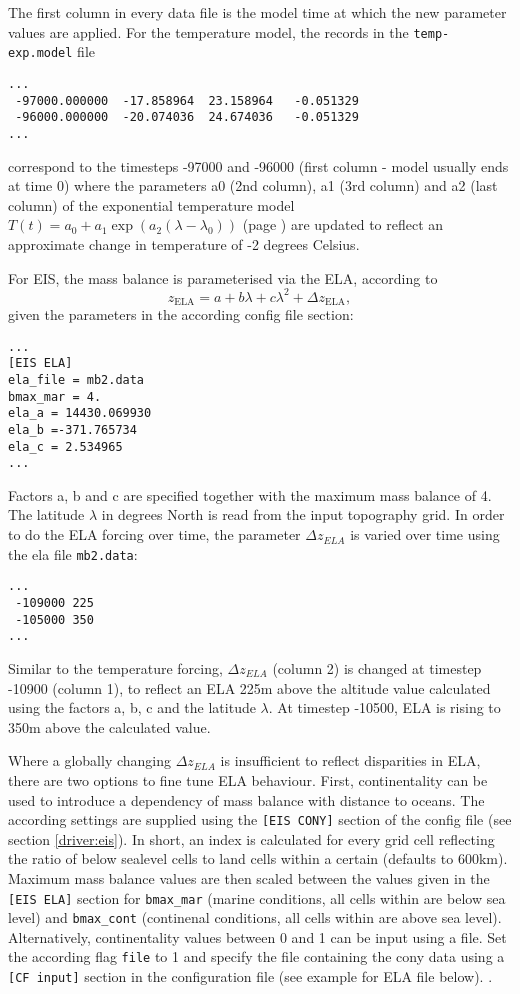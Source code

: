 The first column in every data file is the model time at which the new
parameter values are applied. For the temperature model, the records in the
\texttt{temp-exp.model} file
\begin{verbatim}
...
 -97000.000000  -17.858964  23.158964   -0.051329
 -96000.000000  -20.074036  24.674036   -0.051329
...
\end{verbatim}

correspond to the timesteps -97000 and -96000 (first column - model usually
ends at time 0) where the parameters a0 (2nd column), a1 (3rd column) and a2
(last column) of the exponential temperature model $T(t)=a_0+a_1\exp\left(a_2(\lambda-\lambda_0)\right)$
(page \pageref{driver:eis})
are updated to reflect an approximate change in temperature of -2 degrees
Celsius.

For EIS, the mass balance is parameterised via the ELA, according to
$$z_{\text{ELA}} = a + b\lambda + c\lambda^2 + \Delta z_{\text{ELA}},$$
given the parameters in the according config file section:
\begin{verbatim}
...
[EIS ELA]
ela_file = mb2.data
bmax_mar = 4.
ela_a = 14430.069930
ela_b =-371.765734
ela_c = 2.534965
...
\end{verbatim}
Factors a, b and c are specified together with the maximum mass balance of 4. The
latitude $\lambda$ in degrees North is read from the input topography grid. In
order to do the ELA forcing over time, the parameter $\Delta z_{ELA}$ is varied
over time using the ela file \texttt{mb2.data}:
\begin{verbatim}
...
 -109000 225
 -105000 350
...
\end{verbatim}

Similar to the temperature forcing, $\Delta z_{ELA}$ (column 2) is changed at
timestep -10900 (column 1), to reflect an ELA 225m above the altitude value
calculated using the factors a, b, c and the latitude $\lambda$. At timestep
-10500, ELA is rising to 350m above the calculated value.

Where a globally changing $\Delta z_{ELA}$ is insufficient to reflect
disparities in ELA, there are two options to fine tune ELA behaviour. First,
continentality can be used to introduce a dependency of mass balance with
distance to oceans. The according settings are supplied using the \texttt{[EIS CONY]}
section of the config file (see section \ref{driver:eis}).
In short, an index is calculated for every grid cell reflecting 
the ratio of below sealevel cells to land cells within a certain  (defaults to 600km).
Maximum mass balance values are then scaled between the values given in the \texttt{[EIS ELA]} section 
for \texttt{bmax\_mar} (marine conditions, all cells within  are below sea level) and
\texttt{bmax\_cont} (continenal conditions, all cells within  are above sea level).
Alternatively, continentality values between 0 and 1 can be input using a file. Set the according
flag \texttt{file} to 1 and specify the file containing the cony data using a \texttt{[CF input]} section
in the configuration file (see example for ELA file below).
.

